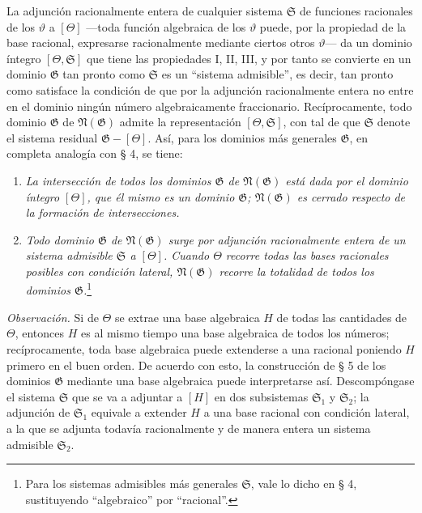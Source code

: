 La adjunción racionalmente entera de cualquier sistema $\mathfrak S$ de funciones racionales de los $\vartheta$ a $[\Theta]$ ---toda función algebraica de los $\vartheta$ puede, por la propiedad de la base racional, expresarse racionalmente mediante ciertos otros $\vartheta$--- da un dominio íntegro $[\Theta,\mathfrak S]$ que tiene las propiedades I, II, III, y por tanto se convierte en un dominio $\mathfrak G$ tan pronto como $\mathfrak S$ es un ``sistema admisible'', es decir, tan pronto como satisface la condición de que por la adjunción racionalmente entera no entre en el dominio ningún número algebraicamente fraccionario. Recíprocamente, todo dominio $\mathfrak G$ de $\mathfrak N(\mathfrak G)$ admite la representación $[\Theta,\mathfrak S]$, con tal de que $\mathfrak S$ denote el sistema residual $\mathfrak G-[\Theta]$. Así, para los dominios más generales $\mathfrak G$, en completa analogía con § 4, se tiene:
\begin{enumerate}
\item[a)] \emph{La intersección de todos los dominios $\mathfrak G$ de $\mathfrak N(\mathfrak G)$ está dada por el dominio íntegro $[\Theta]$, que él mismo es un dominio $\mathfrak G$; $\mathfrak N(\mathfrak G)$ es cerrado respecto de la formación de intersecciones.}
\item[b)] \emph{Todo dominio $\mathfrak G$ de $\mathfrak N(\mathfrak G)$ surge por adjunción racionalmente entera de un sistema admisible $\mathfrak S$ a $[\Theta]$. Cuando $\Theta$ recorre todas las bases racionales posibles con condición lateral, $\mathfrak N(\mathfrak G)$ recorre la totalidad de todos los dominios $\mathfrak G$.}\footnote{Para los sistemas admisibles más generales $\mathfrak S$, vale lo dicho en § 4, sustituyendo ``algebraico'' por ``racional''.}
\end{enumerate}

\emph{Observación.} Si de $\Theta$ se extrae una base algebraica $H$ de todas las cantidades de $\Theta$, entonces $H$ es al mismo tiempo una base algebraica de todos los números; recíprocamente, toda base algebraica puede extenderse a una racional poniendo $H$ primero en el buen orden. De acuerdo con esto, la construcción de § 5 de los dominios $\mathfrak G$ mediante una base algebraica puede interpretarse así. Descompóngase el sistema $\mathfrak S$ que se va a adjuntar a $[H]$ en dos subsistemas $\mathfrak S_1$ y $\mathfrak S_2$; la adjunción de $\mathfrak S_1$ equivale a extender $H$ a una base racional con condición lateral, a la que se adjunta todavía racionalmente y de manera entera un sistema admisible $\mathfrak S_2$.

